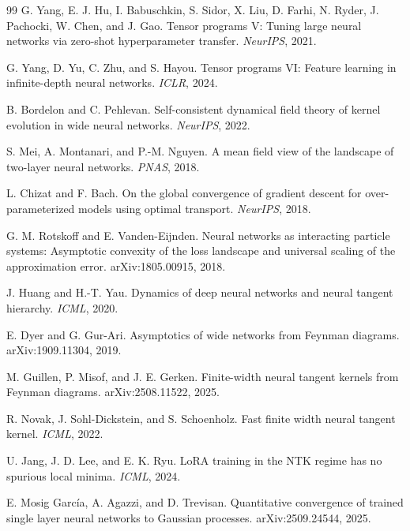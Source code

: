 \documentclass{article}
\begin{document}
\begin{thebibliography}{99}
G. Yang, E. J. Hu, I. Babuschkin, S. Sidor, X. Liu, D. Farhi, N. Ryder, J. Pachocki, W. Chen, and J. Gao.
\newblock Tensor programs V: Tuning large neural networks via zero-shot hyperparameter transfer.
\newblock \emph{NeurIPS}, 2021.

G. Yang, D. Yu, C. Zhu, and S. Hayou.
\newblock Tensor programs VI: Feature learning in infinite-depth neural networks.
\newblock \emph{ICLR}, 2024.

B. Bordelon and C. Pehlevan.
\newblock Self-consistent dynamical field theory of kernel evolution in wide neural networks.
\newblock \emph{NeurIPS}, 2022.

S. Mei, A. Montanari, and P.-M. Nguyen.
\newblock A mean field view of the landscape of two-layer neural networks.
\newblock \emph{PNAS}, 2018.

L. Chizat and F. Bach.
\newblock On the global convergence of gradient descent for over-parameterized models using optimal transport.
\newblock \emph{NeurIPS}, 2018.

G. M. Rotskoff and E. Vanden-Eijnden.
\newblock Neural networks as interacting particle systems: Asymptotic convexity of the loss landscape and universal scaling of the approximation error.
\newblock arXiv:1805.00915, 2018.

J. Huang and H.-T. Yau.
\newblock Dynamics of deep neural networks and neural tangent hierarchy.
\newblock \emph{ICML}, 2020.

E. Dyer and G. Gur-Ari.
\newblock Asymptotics of wide networks from Feynman diagrams.
\newblock arXiv:1909.11304, 2019.

M. Guillen, P. Misof, and J. E. Gerken.
\newblock Finite-width neural tangent kernels from Feynman diagrams.
\newblock arXiv:2508.11522, 2025.

R. Novak, J. Sohl-Dickstein, and S. Schoenholz.
\newblock Fast finite width neural tangent kernel.
\newblock \emph{ICML}, 2022.

U. Jang, J. D. Lee, and E. K. Ryu.
\newblock LoRA training in the NTK regime has no spurious local minima.
\newblock \emph{ICML}, 2024.

E. Mosig García, A. Agazzi, and D. Trevisan.
\newblock Quantitative convergence of trained single layer neural networks to Gaussian processes.
\newblock arXiv:2509.24544, 2025.
\end{thebibliography}
\end{document}
